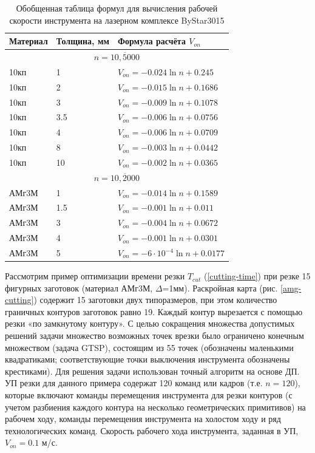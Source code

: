 \documentclass[12pt,twoside]{report}
\begin{document}
\begin{table}
  \caption{Обобщенная таблица формул для вычисления рабочей скорости инструмента на лазерном комплексе ByStar3015}
  \label{v-formulae}
  \begin{tabular}{lll}
    \hline
    Материал & Толщина, мм & Формула расчёта $V_{on}$ \\
    \hline
    \multicolumn{3}{c}{$n=\overline{10,5000}$} \\
    10кп & 1 & $V_{on} = -0.024 \ln n+0.245$ \\
    10кп & 2 & $V_{on} = -0.015 \ln n+0.1686$ \\
    10кп & 3 & $V_{on} = -0.009 \ln n+0.1078$ \\
    10кп & 3.5 & $V_{on} = -0.006 \ln n+0.0756$ \\
    10кп & 4 & $V_{on} = -0.006 \ln n+0.0709$ \\
    10кп & 8 & $V_{on} = -0.003 \ln n+0.0442$ \\
    10кп & 10 & $V_{on} = -0.002 \ln n+0.0365$ \\
    \multicolumn{3}{c}{$n=\overline{10,2000}$} \\
    АМг3М & 1 & $V_{on} = -0.014 \ln n+0.1589$ \\
    АМг3М & 1.5 & $V_{on} = -0.001 \ln n+0.011$ \\
    АМг3М & 3 & $V_{on} = -0.004 \ln n+0.0672$ \\
    АМг3М & 4 & $V_{on} = -0.001 \ln n+0.0301$ \\
    АМг3М & 5 & $V_{on} = -6\cdot 10^{-4} \ln n+0.0177$ \\
  \end{tabular}
\end{table}

Рассмотрим пример оптимизации времени резки
$T_{cut}$
(\ref{cutting-time})
при резке 15 фигурных заготовок
(материал АМг3М, $\Delta$=1мм).
Раскройная карта (рис. \ref{amg-cutting})
содержит 15 заготовки двух типоразмеров,
при этом количество граничных контуров заготовок равно 19.
Каждый контур вырезается с помощью резки
«по замкнутому контуру».
С целью сокращения множества допустимых решений
задачи множество возможных точек врезки было
ограничено конечным множеством (задача GTSP),
состоящим из 55 точек
(обозначены маленькими квадратиками;
соответствующие точки выключения инструмента обозначены крестиками).
Для решения задачи использован точный алгоритм на основе ДП.
УП резки для данного примера содержат 120 команд или кадров
(т.е. $n=120$),
которые включают команды перемещения инструмента
для резки контуров
(с учетом разбиения каждого контура на несколько геометрических примитивов)
на рабочем ходу,
команды перемещения инструмента на холостом ходу
и ряд технологических команд.
Скорость рабочего хода инструмента, заданная в УП,
$V_{on}=0.1$ м/с.
\end{document}
